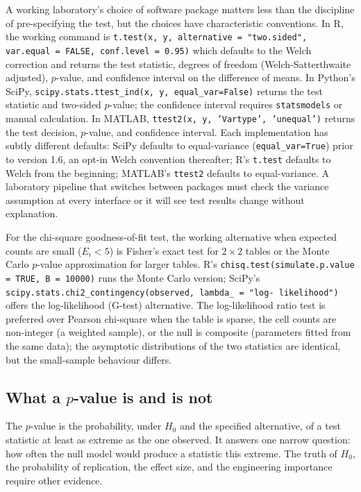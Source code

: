 A working laboratory's choice of software package matters less than
the discipline of pre-specifying the test, but the choices have
characteristic conventions. In R, the working command is
\texttt{t.test(x, y, alternative = "two.sided", var.equal = FALSE,
conf.level = 0.95)} which defaults to the Welch correction and
returns the test statistic, degrees of freedom (Welch-Satterthwaite
adjusted), $p$-value, and confidence interval on the difference of
means. In Python's SciPy, \texttt{scipy.stats.ttest\_ind(x, y,
equal\_var=False)} returns the test statistic and two-sided
$p$-value; the confidence interval requires \texttt{statsmodels} or
manual calculation. In MATLAB, \texttt{ttest2(x, y, 'Vartype',
'unequal')} returns the test decision, $p$-value, and confidence
interval. Each implementation has subtly different defaults: SciPy
defaults to equal-variance (\texttt{equal\_var=True}) prior to
version 1.6, an opt-in Welch convention thereafter; R's
\texttt{t.test} defaults to Welch from the beginning; MATLAB's
\texttt{ttest2} defaults to equal-variance. A laboratory pipeline
that switches between packages must check the variance assumption
at every interface or it will see test results change without
explanation.

For the chi-square goodness-of-fit test, the working alternative
when expected counts are small ($E_{i} < 5$) is Fisher's exact test
for $2 \times 2$ tables or the Monte Carlo $p$-value approximation
for larger tables. R's \texttt{chisq.test(simulate.p.value = TRUE,
B = 10000)} runs the Monte Carlo version; SciPy's
\texttt{scipy.stats.chi2\_contingency(observed, lambda\_ = "log-
likelihood")} offers the log-likelihood (G-test) alternative. The
log-likelihood ratio test is preferred over Pearson chi-square
when the table is sparse, the cell counts are non-integer (a
weighted sample), or the null is composite (parameters fitted from
the same data); the asymptotic distributions of the two statistics
are identical, but the small-sample behaviour differs.

\subsection{What a $p$-value is and is not}

The $p$-value is the probability, under $H_{0}$ and the specified
alternative, of a test statistic at least as extreme as the one
observed. It answers one narrow question: how often the null model
would produce a statistic this extreme. The truth of $H_{0}$, the
probability of replication, the effect size, and the engineering
importance require other evidence.


